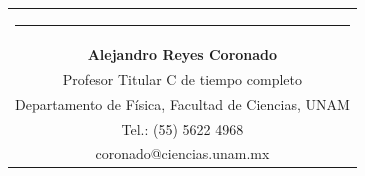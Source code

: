 \documentclass[9pt,letterpaper]{article}
\begin{document}
	{\vspace{-2.53cm}\hspace{7cm}\begin{tabular} { c}
			\setlength{\tabcolsep}{15pt}
			\renewcommand{\arraystretch}{1}
			\noindent\rule{5.5cm}{0.4pt}\qquad \\
			
			\qquad  \textbf{Alejandro Reyes Coronado} \qquad \\
			\qquad Profesor Titular C de tiempo completo  \qquad \\  
			\qquad Departamento de Física, Facultad de Ciencias, UNAM\qquad \\ 
			\qquad  Tel.: (55) 5622 4968 \qquad \\
			\qquad coronado@ciencias.unam.mx \qquad \\
			
		\end{tabular}
		
	}
	
	
	
	
	
	
	
	
	
\end{document}
